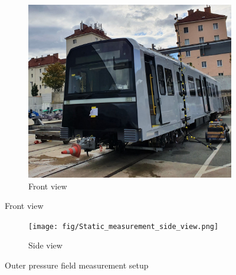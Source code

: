 \begin{figure}[H]
     \centering
     \begin{subfigure}[b]{0.7\textwidth}
         \centering
         \includegraphics[width=\linewidth]{fig/Static_measurement_front_view.jpg}
         \caption{Front view}
         \label{fig:ubxfrontview}
     \end{subfigure}
\end{figure}

\begin{figure}[H]\ContinuedFloat
    \centering
    \begin{subfigure}[b]{\textwidth}
         \centering
         \texttt{[image: fig/Static\_measurement\_side\_view.png]}
         \caption{Side view}
         \label{fig:ubxsideview}
     \end{subfigure}
     \caption{Outer pressure field measurement setup}
     \label{fig:outersetup}
\end{figure}

